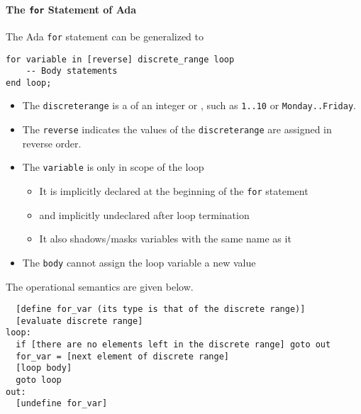 \paragraph{The \texttt{for} Statement of Ada}\label{par:Counter_Controlled_Loops-Ada}
The Ada \texttt{for} statement can be generalized to
\begin{verbatim}
for variable in [reverse] discrete_range loop
    -- Body statements
end loop;
\end{verbatim}
\begin{itemize}[noitemsep]
\item The \texttt{discrete\textunderscore{}range} is a  of an integer or , such as \texttt{1..10} or \texttt{Monday..Friday}.
\item The \texttt{reverse}  indicates the values of the \texttt{discrete\textunderscore{}range} are assigned in reverse order.
\item The \texttt{variable} is only in scope of the loop
  \begin{itemize}[noitemsep]
  \item It is implicitly declared at the beginning of the \texttt{for} statement
  \item and implicitly undeclared after loop termination
  \item It also shadows/masks variables with the same name as it
  \end{itemize}
\item The \texttt{body} cannot assign the loop variable a new value
\end{itemize}

The operational semantics are given below.
\begin{verbatim}
  [define for_var (its type is that of the discrete range)]
  [evaluate discrete range]
loop:
  if [there are no elements left in the discrete range] goto out
  for_var = [next element of discrete range]
  [loop body]
  goto loop
out:
  [undefine for_var]
\end{verbatim}


